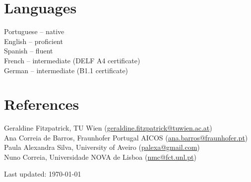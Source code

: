 \documentclass[11pt, a4paper]{article} %
\begin{document}
\section*{Languages}

Portuguese -- native\\
English -- proficient\\
Spanish -- fluent\\
French -- intermediate (DELF A4 certificate)\\
German -- intermediate (B1.1 certificate)\\

\section*{References}

Geraldine Fitzpatrick, TU Wien (\href{mailto:geraldine.fitzpatrick@tuwien.ac.at}{geraldine.fitzpatrick@tuwien.ac.at})\\
Ana Correia de Barros, Fraunhofer Portugal AICOS
(\href{mailto:ana.barros@fraunhofer.pt}{ana.barros@fraunhofer.pt})\\
Paula Alexandra Silva, University of Aveiro (\href{mailto:palexa@gmail.com}{palexa@gmail.com})\\
Nuno Correia, Universidade NOVA de Lisboa (\href{mailto:nmc@fct.unl.pt}{nmc@fct.unl.pt})\\





\begin{center}
{\scriptsize Last updated: \today\ } %
\end{center}

\end{document}
